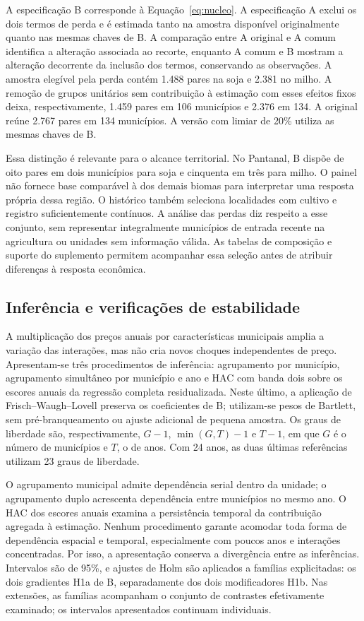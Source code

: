 A especificação B corresponde à Equação~\ref{eq:nucleo}. A especificação A exclui os dois termos de perda e é estimada tanto na amostra disponível originalmente quanto nas mesmas chaves de B. A comparação entre A original e A comum identifica a alteração associada ao recorte, enquanto A comum e B mostram a alteração decorrente da inclusão dos termos, conservando as observações. A amostra elegível pela perda contém 1.488 pares na soja e 2.381 no milho. A remoção de grupos unitários sem contribuição à estimação com esses efeitos fixos deixa, respectivamente, 1.459 pares em 106 municípios e 2.376 em 134. A original reúne 2.767 pares em 134 municípios. A versão com limiar de 20\% utiliza as mesmas chaves de B.

Essa distinção é relevante para o alcance territorial. No Pantanal, B dispõe de oito pares em dois municípios para soja e cinquenta em três para milho. O painel não fornece base comparável à dos demais biomas para interpretar uma resposta própria dessa região. O histórico também seleciona localidades com cultivo e registro suficientemente contínuos. A análise das perdas diz respeito a esse conjunto, sem representar integralmente municípios de entrada recente na agricultura ou unidades sem informação válida. As tabelas de composição e suporte do suplemento permitem acompanhar essa seleção antes de atribuir diferenças à resposta econômica.

\subsection{Inferência e verificações de estabilidade}

A multiplicação dos preços anuais por características municipais amplia a variação das interações, mas não cria novos choques independentes de preço. Apresentam-se três procedimentos de inferência: agrupamento por município, agrupamento simultâneo por município e ano e HAC com banda dois sobre os escores anuais da regressão completa residualizada. Neste último, a aplicação de Frisch--Waugh--Lovell preserva os coeficientes de B; utilizam-se pesos de Bartlett, sem pré-branqueamento ou ajuste adicional de pequena amostra. Os graus de liberdade são, respectivamente, $G-1$, $\min(G,T)-1$ e $T-1$, em que $G$ é o número de municípios e $T$, o de anos. Com 24 anos, as duas últimas referências utilizam 23 graus de liberdade.

O agrupamento municipal admite dependência serial dentro da unidade; o agrupamento duplo acrescenta dependência entre municípios no mesmo ano. O HAC dos escores anuais examina a persistência temporal da contribuição agregada à estimação. Nenhum procedimento garante acomodar toda forma de dependência espacial e temporal, especialmente com poucos anos e interações concentradas. Por isso, a apresentação conserva a divergência entre as inferências. Intervalos são de 95\%, e ajustes de Holm são aplicados a famílias explicitadas: os dois gradientes H1a de B, separadamente dos dois modificadores H1b. Nas extensões, as famílias acompanham o conjunto de contrastes efetivamente examinado; os intervalos apresentados continuam individuais.

